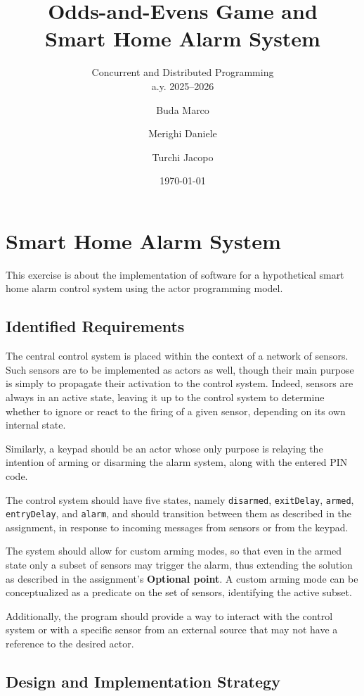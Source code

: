 \documentclass{scrartcl}
\title{\LARGE
  Odds-and-Evens Game and \\ Smart Home Alarm System
}
\subtitle{Concurrent and Distributed Programming\\a.y. 2025--2026}
\author{
    Buda Marco \and Merighi Daniele \and Turchi Jacopo
}
\date{\today}
\begin{document}
\maketitle

\section{Smart Home Alarm System}

This exercise is about the implementation of software for a hypothetical smart home alarm control system using the actor programming model.

\subsection{Identified Requirements}

The central control system is placed within the context of a network of sensors. Such sensors are to be implemented as actors as well, though their main purpose is simply to propagate their activation to the control system. Indeed, sensors are always in an active state, leaving it up to the control system to determine whether to ignore or react to the firing of a given sensor, depending on its own internal state.

Similarly, a keypad should be an actor whose only purpose is relaying the intention of arming or disarming the alarm system, along with the entered PIN code.

The control system should have five states, namely \texttt{disarmed}, \texttt{exitDelay}, \texttt{armed}, \texttt{entryDelay}, and \texttt{alarm}, and should transition between them as described in the assignment, in response to incoming messages from sensors or from the keypad.

The system should allow for custom arming modes, so that even in the armed state only a subset of sensors may trigger the alarm, thus extending the solution as described in the assignment's \textbf{Optional point}. A custom arming mode can be conceptualized as a predicate on the set of sensors, identifying the active subset.

Additionally, the program should provide a way to interact with the control system or with a specific sensor from an external source that may not have a reference to the desired actor.

\subsection{Design and Implementation Strategy}
\end{document}
